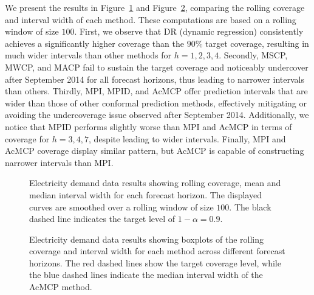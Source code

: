\documentclass[
  11pt,
  a4paper,
]{article}
\theoremstyle{plain}
\theoremstyle{remark}
\begin{document}
We present the results in Figure~\ref{fig-elec_cov} and
Figure~\ref{fig-elec_box}, comparing the rolling coverage and interval
width of each method. These computations are based on a rolling window
of size \(100\). First, we observe that DR (dynamic regression)
consistently achieves a significantly higher coverage than the \(90\%\)
target coverage, resulting in much wider intervals than other methods
for \(h=1,2,3,4\). Secondly, MSCP, MWCP, and MACP fail to sustain the
target coverage and noticeably undercover after September 2014 for all
forecast horizons, thus leading to narrower intervals than others.
Thirdly, MPI, MPID, and AcMCP offer prediction intervals that are wider
than those of other conformal prediction methods, effectively mitigating
or avoiding the undercoverage issue observed after September 2014.
Additionally, we notice that MPID performs slightly worse than MPI and
AcMCP in terms of coverage for \(h=3,4,7\), despite leading to wider
intervals. Finally, MPI and AcMCP coverage display similar pattern, but
AcMCP is capable of constructing narrower intervals than MPI.

\begin{figure}


\caption{\label{fig-elec_cov}Electricity demand data results showing
rolling coverage, mean and median interval width for each forecast
horizon. The displayed curves are smoothed over a rolling window of size
\(100\). The black dashed line indicates the target level of
\(1-\alpha=0.9\).}

\end{figure}%

\begin{figure}


\caption{\label{fig-elec_box}Electricity demand data results showing
boxplots of the rolling coverage and interval width for each method
across different forecast horizons. The red dashed lines show the target
coverage level, while the blue dashed lines indicate the median interval
width of the AcMCP method.}

\end{figure}%
\end{document}
